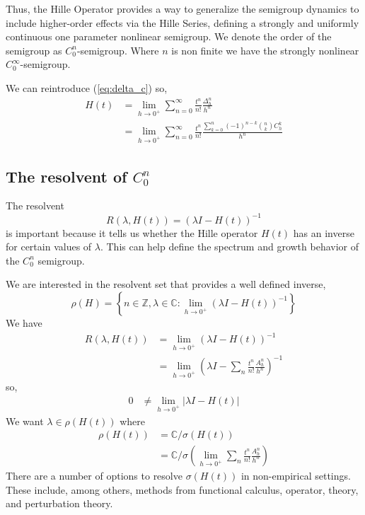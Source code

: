 \documentclass{article}
\newcommand{\Z}{\mathbb{Z}}
\newcommand{\C}{\mathbb{C}}
\begin{document}
Thus, the Hille Operator provides a way to generalize the semigroup dynamics to include higher-order effects via the Hille Series, defining a strongly and uniformly continuous one parameter nonlinear semigroup. We denote the order of the semigroup as $C_0^n$-semigroup. Where $n$ is non finite we have the strongly nonlinear $C_0^\infty$-semigroup. 

We can reintroduce (\ref{eq:delta_c}) so,
\begin{align*}
    H(t)  &= \lim_{h\rightarrow0^+} \sum_{n=0}^\infty \frac{t^n}{n!} \frac{\Delta_h^n}{h^n} \\
    &= \lim_{h\rightarrow0^+} \sum_{n=0}^\infty \frac{t^n}{n!} \frac{ \sum_{k=0}^n (-1)^{n-k} {n \choose k} C_h^k}{h^n}
\end{align*}

\subsection{The resolvent of $C^n_0$}

The resolvent 
$$
    R(\lambda, H(t)) = (\lambda I - H(t))^{-1}
$$
is important because it tells us whether the Hille operator $H(t)$ has an inverse for certain values of $\lambda$. This can help define the spectrum and growth behavior of the $C^n_0$ semigroup.

We are interested in the resolvent set that provides a well defined inverse,
$$
    \rho(H) = \left\{ n\in\Z, \lambda\in\C: \lim_{h\rightarrow0^+} \left( \lambda I - H(t) \right) ^{-1}\right\}
$$ 
We have
\begin{align*}
     R(\lambda, H(t)) &= \lim_{h\rightarrow0^+}\left( \lambda I - H(t)\right) ^{-1}\\
     &= \lim_{h\rightarrow0^+}\left( \lambda I - \sum_n \frac{t^n}{n!} \frac{A^n_h}{h^n}\right) ^{-1}
\end{align*}
so,
\begin{align*}
     0 &\neq \lim_{h\rightarrow0^+} \left| \lambda I - H(t) \right|
\end{align*}
We want $\lambda \in \rho(H(t))$ where
\begin{align*}
    \rho(H(t)) &=\C /  \sigma\left(H(t)\right)\\
    &= \C /  \sigma\left(\lim_{h\rightarrow0^+} \sum_n \frac{t^n}{n!} \frac{A^n_h}{h^n}\right)
\end{align*}
There are a number of options to resolve $\sigma(H(t))$ in non-empirical settings. These include, among others, methods from functional calculus, operator, theory, and perturbation theory.
\end{document}
